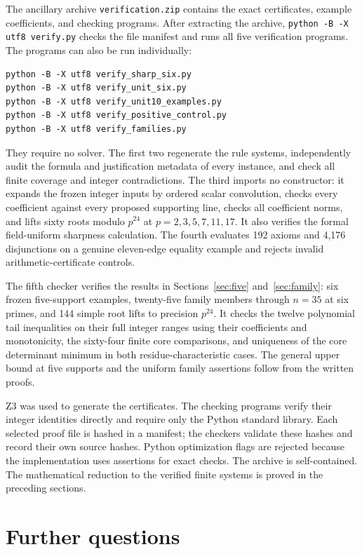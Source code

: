 \documentclass[11pt]{article}
\theoremstyle{remark}\newtheorem{remark}[theorem]{Remark}
\begin{document}
The ancillary archive \texttt{verification.zip} contains the exact
certificates, example coefficients, and checking programs. After
extracting the archive, \texttt{python -B -X utf8 verify.py} checks
the file manifest and runs all five verification programs. The
programs can also be run individually:
\begin{verbatim}
python -B -X utf8 verify_sharp_six.py
python -B -X utf8 verify_unit_six.py
python -B -X utf8 verify_unit10_examples.py
python -B -X utf8 verify_positive_control.py
python -B -X utf8 verify_families.py
\end{verbatim}
They require no solver. The first two regenerate the rule systems,
independently audit the formula and justification metadata of every
instance, and check all finite coverage and integer contradictions.
The third imports no constructor: it expands the frozen integer
inputs by ordered scalar convolution, checks every coefficient
against every proposed supporting line, checks all coefficient norms,
and lifts sixty roots modulo $p^{24}$ at
$p=2,3,5,7,11,17$. It also verifies the formal field-uniform sharpness
calculation. The fourth evaluates 192 axioms and 4,176 disjunctions
on a genuine eleven-edge equality example and rejects invalid
arithmetic-certificate controls.

The fifth checker verifies the results in
Sections~\ref{sec:five} and~\ref{sec:family}: six frozen five-support
examples, twenty-five family members through $n=35$ at six primes,
and 144 simple root lifts to precision $p^{24}$. It checks the twelve
polynomial tail inequalities on their full integer ranges using
their coefficients and monotonicity, the sixty-four finite core
comparisons, and uniqueness of the core determinant minimum in both
residue-characteristic cases. The general upper bound at five supports
and the uniform family assertions follow from the written proofs.

Z3 was used to generate the certificates. The checking programs
verify their integer identities directly and require only the Python
standard library. Each selected proof file is hashed in a manifest;
the checkers validate these hashes and record their own source hashes.
Python optimization flags are rejected because the implementation
uses assertions for exact checks. The archive is self-contained.
The mathematical reduction to the verified finite systems is proved
in the preceding sections.

\section{Further questions}
\end{document}

